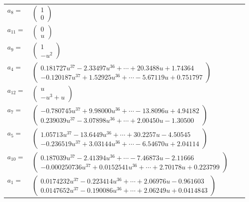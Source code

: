 \documentclass[1p]{elsarticle_modified}
\theoremstyle{definition}
\begin{document}
\begin{tabular}{m{7pt} m{180pt} m{7pt} m{180pt} }
\flushright $a_{8}=$&$\begin{pmatrix}1\\0\end{pmatrix}$ \\
\flushright $a_{11}=$&$\begin{pmatrix}0\\u\end{pmatrix}$ \\
\flushright $a_{9}=$&$\begin{pmatrix}1\\- u^2\end{pmatrix}$ \\
\flushright $a_{4}=$&$\begin{pmatrix}0.181727 u^{37}-2.33497 u^{36}+\cdots+20.3488 u+1.74364\\-0.120187 u^{37}+1.52925 u^{36}+\cdots-5.67119 u+0.751797\end{pmatrix}$ \\
\flushright $a_{12}=$&$\begin{pmatrix}u\\- u^3+u\end{pmatrix}$ \\
\flushright $a_{7}=$&$\begin{pmatrix}-0.780745 u^{37}+9.98000 u^{36}+\cdots-13.8096 u+4.94182\\0.239039 u^{37}-3.07898 u^{36}+\cdots+2.00450 u-1.30500\end{pmatrix}$ \\
\flushright $a_{5}=$&$\begin{pmatrix}1.05713 u^{37}-13.6449 u^{36}+\cdots+30.2257 u-4.50545\\-0.236519 u^{37}+3.03144 u^{36}+\cdots-6.54670 u+2.04114\end{pmatrix}$ \\
\flushright $a_{10}=$&$\begin{pmatrix}0.187039 u^{37}-2.41394 u^{36}+\cdots-7.46873 u-2.11666\\-0.000250736 u^{37}+0.0152541 u^{36}+\cdots+2.70178 u+0.223799\end{pmatrix}$ \\
\flushright $a_{1}=$&$\begin{pmatrix}0.0174232 u^{37}-0.223414 u^{36}+\cdots+2.06976 u-0.961603\\0.0147652 u^{37}-0.190086 u^{36}+\cdots+2.06249 u+0.0414843\end{pmatrix}$ \\

\end{tabular}
\end{document}
